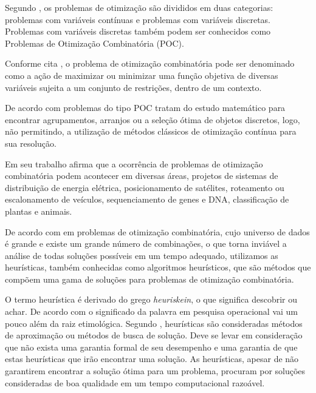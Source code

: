 Segundo \cite{steiglitz1982combinatorial}, os problemas de otimização são divididos em duas categorias: problemas com variáveis contínuas e problemas com variáveis discretas. Problemas com variáveis discretas também podem ser conhecidos como Problemas de Otimização Combinatória (POC).\par

Conforme cita \cite{raupp2003introduccao}, o problema de otimização combinatória pode ser denominado como a ação de maximizar ou minimizar uma função objetiva de diversas variáveis sujeita a um conjunto de restrições, dentro de um contexto.\par

De acordo com \cite{opac-b1092847} problemas do tipo POC tratam do estudo matemático para encontrar agrupamentos, arranjos ou a seleção ótima de objetos discretos, logo, não permitindo, a utilização de métodos clássicos de otimização contínua para sua resolução.\par


Em seu trabalho \cite{golbarg2000otimizaccao} afirma que a ocorrência de problemas de otimização combinatória podem acontecer em diversas áreas, projetos de sistemas de distribuição de energia elétrica, posicionamento de satélites, roteamento ou escalonamento de veículos, sequenciamento de genes e DNA, classificação de plantas e animais.\par

De acordo com \cite{deleonardo} em problemas de otimização combinatória, cujo universo de dados é grande e existe um grande número de combinações, o que torna inviável a análise de todas soluções possíveis em um tempo adequado, utilizamos as heurísticas, também conhecidas como algoritmos heurísticos, que são métodos que compõem uma gama de soluções para problemas de otimização combinatória.


O termo heurística é derivado do grego \textit{heuriskein}, o que significa descobrir ou achar. De acordo com \cite{timoteo2005desenvolvimento} o significado da palavra em pesquisa operacional vai um pouco além da raiz etimológica. Segundo \cite{steiglitz1982combinatorial}, heurísticas são consideradas métodos de aproximação ou métodos de busca de solução. Deve se levar em consideração que não exista uma garantia formal de seu desempenho e uma garantia de que estas heurísticas que irão encontrar uma solução. As heurísticas, apesar de não garantirem encontrar a solução ótima para um problema, procuram por soluções consideradas de boa qualidade em um tempo computacional razoável.\par

